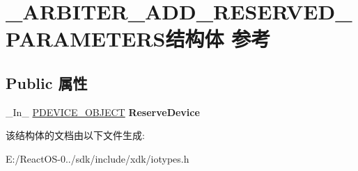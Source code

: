 \hypertarget{struct___a_r_b_i_t_e_r___a_d_d___r_e_s_e_r_v_e_d___p_a_r_a_m_e_t_e_r_s}{}\section{\+\_\+\+A\+R\+B\+I\+T\+E\+R\+\_\+\+A\+D\+D\+\_\+\+R\+E\+S\+E\+R\+V\+E\+D\+\_\+\+P\+A\+R\+A\+M\+E\+T\+E\+R\+S结构体 参考}
\label{struct___a_r_b_i_t_e_r___a_d_d___r_e_s_e_r_v_e_d___p_a_r_a_m_e_t_e_r_s}
\subsection*{Public 属性}
\begin{DoxyCompactItemize}
\item 
\mbox{\label{struct___a_r_b_i_t_e_r___a_d_d___r_e_s_e_r_v_e_d___p_a_r_a_m_e_t_e_r_s_ae50a891c4b8d8ade7080436b1f40ae75}} 
\+\_\+\+In\+\_\+ \hyperlink{struct___d_e_v_i_c_e___o_b_j_e_c_t}{P\+D\+E\+V\+I\+C\+E\+\_\+\+O\+B\+J\+E\+CT} {\bfseries Reserve\+Device}
\end{DoxyCompactItemize}


该结构体的文档由以下文件生成\+:\begin{DoxyCompactItemize}
\item 
E\+:/\+React\+O\+S-\/0../sdk/include/xdk/iotypes.\+h\end{DoxyCompactItemize}
